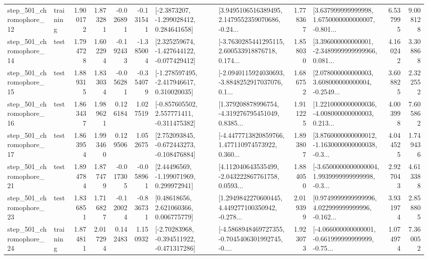 \begin{tabular}{llrrrrllrlrr}
  step\_501\_chromophore\_12 &  training &      1.900172 &    1.873281 &     -0.026891 & -0.131541 &     [-2.3873207, -1.299028412, 0.284641658] &  [3.9495106516389495, 2.1479552359070686, -0.24... &       1.778367 &  [3.637999999999998, 1.6750000000000007, -0.801... &            6.537995 &          9.008128 \\
  step\_501\_chromophore\_14 &      test &      1.794728 &    1.602294 &     -0.192433 & -1.385004 &   [2.325259674, -1.427644122, -0.077429412] &  [-3.7630285441295115, 2.600533918876718, 0.174... &       1.858030 &  [3.396000000000001, -2.3489999999999966, 0.081... &            4.160242 &          3.308868 \\
  step\_501\_chromophore\_15 &      test &      1.889315 &    1.833034 &     -0.056281 & -0.354079 &   [-1.278597495, -2.417946617, 0.310020035] &  [-2.0940115924030693, -3.8848252917037076, 0.1... &       1.686752 &  [2.078000000000003, 3.608000000000004, -0.2549... &            3.608825 &          2.322552 \\
  step\_501\_chromophore\_16 &      test &      1.863437 &    1.989621 &      0.126184 &  1.027519 &   [-0.857605502, 2.557771411, -0.311475382] &  [1.379208878996754, -4.319276795451049, 0.8385... &       1.911225 &  [1.2210000000000036, -4.008000000000003, 0.213... &            4.003998 &          7.605862 \\
  step\_501\_chromophore\_17 &      test &      1.863954 &    1.993460 &      0.129506 &  1.052675 &   [2.752093845, -0.672443273, -0.108476884] &  [-4.4477713820859766, 1.477110974573922, 0.360... &       1.893807 &  [3.8760000000000012, -1.1630000000000038, -0.3... &            4.044525 &          1.749436 \\
  step\_501\_chromophore\_21 &      test &      1.894784 &    1.877479 &     -0.017305 & -0.058961 &     [2.44496569, -1.199071969, 0.299972941] &  [4.112040643535499, -2.043222867761758, 0.0593... &       1.884050 &  [-3.6500000000000004, 1.9939999999999998, -0.3... &            2.927043 &          4.613388 \\
  step\_501\_chromophore\_23 &      test &      1.836851 &    1.716827 &     -0.120024 & -0.836731 &      [0.48618656, 2.621060366, 0.006775779] &  [1.2949842270600445, 4.449277100350942, -0.278... &       2.019399 &  [0.9749999999999996, 4.022999999999996, -0.162... &            3.931974 &          2.858805 \\
  step\_501\_chromophore\_24 &  training &      1.874811 &    2.017294 &      0.142483 &  1.150932 &   [-2.70283968, -0.394511922, -0.471317286] &  [-4.5868948469727355, -0.7045406301992745, -0.... &       1.923073 &  [-4.066000000000001, -0.661999999999999, -0.75... &            1.074974 &          7.360052 \\

\end{tabular}
